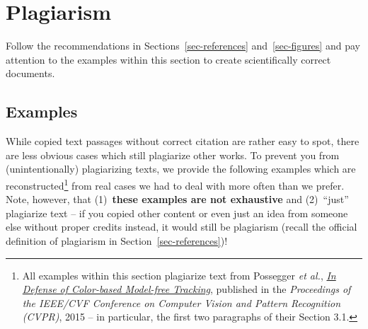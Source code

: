 \documentclass[11pt,a4paper]{article}
\begin{document}
\newpage
\section{Plagiarism}
\label{sec-plagiarism}
 Follow the recommendations in Sections~\ref{sec-references} and~\ref{sec-figures} and pay attention to the examples within this section to create scientifically correct documents.
\subsection{Examples}
While copied text passages without correct citation are rather easy to spot, there are less obvious cases which still plagiarize other works.
To prevent you from (unintentionally) plagiarizing texts, we provide the following examples which are reconstructed\footnote{All examples within this section plagiarize text from Possegger \emph{et al.}, \href{https://ieeexplore.ieee.org/document/7298823}{\emph{In Defense of Color-based Model-free Tracking}}, published in the \emph{Proceedings of the IEEE/CVF Conference on Computer Vision and Pattern Recognition (CVPR)}, 2015 -- in particular, the first two paragraphs of their Section 3.1.} from real cases we had to deal with more often than we prefer.
% 
Note, however, that (1)~\textbf{these examples are not exhaustive} and (2)~``just'' plagiarize text -- if you copied other content or even just an idea from someone else without proper credits instead, it would still be plagiarism (recall the official definition of plagiarism in Section~\ref{sec-references})!
\end{document}
